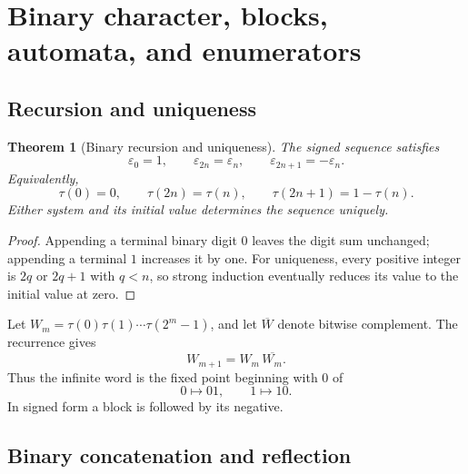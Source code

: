 \documentclass[11pt,oneside]{article}
\numberwithin{equation}{section}
\newtheorem{theorem}{Theorem}[section]
\theoremstyle{definition}
\theoremstyle{remark}
\newcommand{\eps}{\varepsilon}
\begin{document}
\section[Binary character and automata]{Binary character, blocks, automata, and enumerators}
\label{sec:binary}

\subsection{Recursion and uniqueness}

\begin{theorem}[Binary recursion and uniqueness]
\label{thm:binary-recursion}
The signed sequence satisfies
\begin{equation}
  \eps_0=1,
  \qquad
  \eps_{2n}=\eps_n,
  \qquad
  \eps_{2n+1}=-\eps_n.
  \label{eq:eps-recursion}
\end{equation}
Equivalently,
\begin{equation}
  \tau(0)=0,
  \qquad
  \tau(2n)=\tau(n),
  \qquad
  \tau(2n+1)=1-\tau(n).
  \label{eq:tau-recursion}
\end{equation}
Either system and its initial value determines the sequence uniquely.
\end{theorem}

\begin{proof}
Appending a terminal binary digit \(0\) leaves the digit sum unchanged;
appending a terminal \(1\) increases it by one.  For uniqueness, every positive
integer is \(2q\) or \(2q+1\) with \(q<n\), so strong induction eventually
reduces its value to the initial value at zero.
\end{proof}

Let \(W_m=\tau(0)\tau(1)\cdots\tau(2^m-1)\), and let
\(\overline W\) denote bitwise complement.  The recurrence gives
\begin{equation}
  W_{m+1}=W_m\,\overline{W_m}.
  \label{eq:word-recursion}
\end{equation}
Thus the infinite word is the fixed point beginning with \(0\) of
\begin{equation}
  0\longmapsto01,
  \qquad
  1\longmapsto10.
  \label{eq:thue-morphism}
\end{equation}
In signed form a block is followed by its negative.

\subsection{Binary concatenation and reflection}
\end{document}
